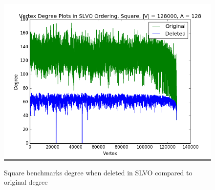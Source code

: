 \documentclass{article}
\begin{document}
\begin{figure}
\begin{minipage}{0.3\textwidth}
    \colorbox{gray}{\includegraphics[width=\linewidth]{./graphs/hist_deg_del_square_6.png}}
    \end{minipage}
    \hspace{\fill}

    \caption{Square benchmarks degree when deleted in SLVO compared to original degree}
    \label{squaredegdelhists}
\end{figure}
\end{document}
